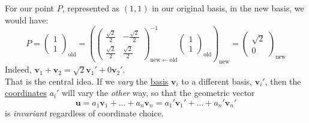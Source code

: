 \documentclass[../master.tex]{subfiles}
\begin{document}
	For our point $P$, represented as $(1,1)$ in our original basis, in the new basis, we would have:
	\begin{equation*}
		P = \begin{pmatrix}
			1 \\ 1
		\end{pmatrix}_{\mathrm{old}}
		= \left( \begin{pmatrix}
			 \frac{\sqrt 2}{2} &  -\frac{\sqrt 2}{2} \\
			 \frac{\sqrt 2}{2} &  \frac{\sqrt 2}{2}
		\end{pmatrix}^{-1}_{\mathrm{new} \leftarrow \mathrm{old}} 		\begin{pmatrix}
			1 \\ 1
		\end{pmatrix}_{\mathrm{old}}\right)_\mathrm{new}
		= \begin{pmatrix}
			\sqrt 2 \\ 0
		\end{pmatrix}_{\mathrm{new}}
	\end{equation*}
	Indeed, $\mathbf v_1 + \mathbf v_2 = \sqrt 2 \mathbf v_1' + 0 \mathbf v_2'$.\\
	
	That is the central idea. If we \emph{vary} the \underline{basis} $\mathbf v_i$ to a different basis, $\mathbf v_i'$, then the \underline{coordinates} $a_i'$ will vary  the \emph{other} way, so that the geometric vector
	\begin{equation*}
		\mathbf u = a_1 \mathbf v_1 + \dots + a_n \mathbf v_n = a_1' \mathbf v_1' + \dots + a_n' \mathbf v_n'
	\end{equation*} is \emph{invariant} regardless of coordinate choice.
	
\end{document}
